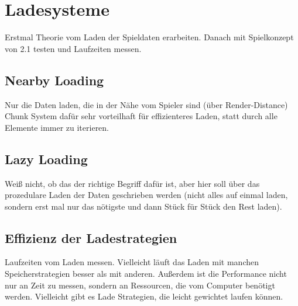 \section{Ladesysteme}\label{sect:ladesysteme}
Erstmal Theorie vom Laden der Spieldaten erarbeiten. Danach mit Spielkonzept
von 2.1 testen und Laufzeiten messen.


\subsection{Nearby Loading}
Nur die Daten laden, die in der Nähe vom Spieler sind (über Render-Distance)\\
Chunk System dafür sehr vorteilhaft für effizienteres Laden, statt durch alle Elemente
immer zu iterieren.


\subsection{Lazy Loading}
Weiß nicht, ob das der richtige Begriff dafür ist, aber hier soll über das prozedulare 
Laden der Daten geschrieben werden (nicht alles auf einmal laden, sondern erst mal nur das
nötigste und dann Stück für Stück den Rest laden). 


\subsection{Effizienz der Ladestrategien}
Laufzeiten vom Laden messen. Vielleicht läuft das Laden mit manchen Speicherstrategien 
besser als mit anderen. Außerdem ist die Performance nicht nur an Zeit zu messen, sondern
an Ressourcen, die vom Computer benötigt werden. Vielleicht gibt es Lade Strategien, die
leicht gewichtet laufen können.




